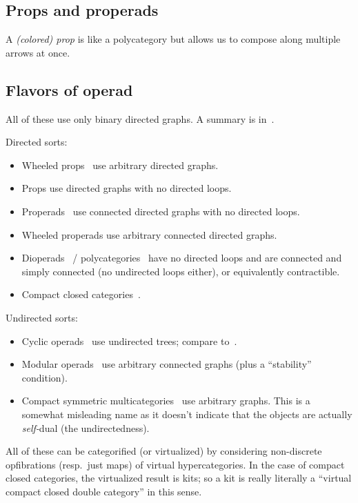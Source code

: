 \documentclass{article}
\theoremstyle{definition}
\theoremstyle{remark}
\begin{document}
\subsection{Props and properads}
\label{sec:props}

A \emph{(colored) prop} is like a polycategory but allows us to compose along multiple arrows at once.


\subsection{Flavors of operad}
\label{sec:operads}

All of these use only binary directed graphs.
A summary is in~\cite{bb:htapm}.

Directed sorts:
\begin{itemize}
\item Wheeled props~\cite{mms:wheeled-props} use arbitrary directed graphs.
\item Props use directed graphs with no directed loops.
\item Properads~\cite{vallette:properads} use connected directed graphs with no directed loops.
\item Wheeled properads use arbitrary connected directed graphs.
\item Dioperads~\cite{gan:dioperads} / polycategories~\cite{szabo:polycats,koslowski:polycats,garner:polycats} have no directed loops and are connected and simply connected (no undirected loops either), or equivalently contractible.~\cite{markl:operads-props}
\item Compact closed categories~\cite{kl:cpt}.
\end{itemize}

Undirected sorts:
\begin{itemize}
\item Cyclic operads~\cite{gk:cyclic-operads} use undirected trees; compare to~\cite{co:flang-cyclic,co:cat-cyclic}.
\item Modular operads~\cite{gk:modular-operads} use arbitrary connected graphs (plus a ``stability'' condition).
\item Compact symmetric multicategories~\cite{jk:feynman} use arbitrary graphs.
  This is a somewhat misleading name as it doesn't indicate that the objects are actually \emph{self-}dual (the undirectedness).
\end{itemize}

All of these can be categorified (or virtualized) by considering non-discrete opfibrations (resp.\ just maps) of virtual hypercategories.
In the case of compact closed categories, the virtualized result is kits; so a kit is really literally a ``virtual compact closed double category'' in this sense.




\end{document}
